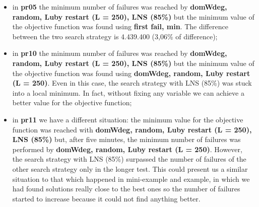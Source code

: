 \begin{itemize}
    \item in \textbf{pr05} the minimum number of failures was reached by \textbf{domWdeg, random, Luby restart (L = 250), LNS (85\%)} but the minimum value of the objective function was found using \textbf{first fail, min}. The difference between the two search strategy is 4.439.400 (3,06\% of difference);
    \item in \textbf{pr10} the minimum number of failures was reached by \textbf{domWdeg, random, Luby restart (L = 250), LNS (85\%)} but the minimum value of the objective function was found using \textbf{domWdeg, random, Luby restart (L = 250)}. Even in this case, the search strategy with LNS (85\%) was stuck into a local minimum. In fact, without fixing any variable we can achieve a better value for the objective function;
    \item in \textbf{pr11} we have a different situation: the minimum value for the objective function was reached with \textbf{domWdeg, random, Luby restart (L = 250), LNS (85\%)} but, after five minutes, the minimum number of failures was performed by \textbf{domWdeg, random, Luby restart (L = 250)}. However, the search strategy with LNS (85\%) surpassed the number of failures of the other search strategy only in the longer test. This could present us a similar situation to that which happened in mini-example and example, in which we had found solutions really close to the best ones so the number of failures started to increase because it could not find anything better. 
\end{itemize}
